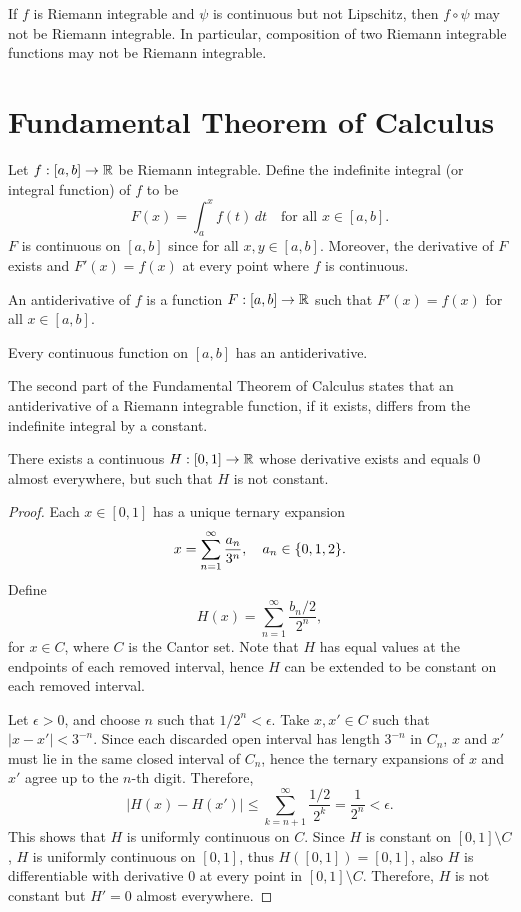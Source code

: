 \begin{rmk}
    If $f$ is Riemann integrable and $\psi$ is continuous but not Lipschitz, then $f \circ \psi$ may not be Riemann integrable. In particular, composition of two Riemann integrable functions may not be Riemann integrable. 
\end{rmk}

\section{Fundamental Theorem of Calculus}

Let $f: [a, b] \to {\mathbb R}$ be Riemann integrable. Define the indefinite integral (or integral function) of $f$ to be
\[
F(x) = \int_a^x f(t) \, dt \quad \text{for all } x \in [a, b].
\]
$F$ is continuous on $[a, b]$ since for all $x, y \in [a, b]$. Moreover, the derivative of $F$ exists and $F'(x) = f(x)$ at every point where $f$ is continuous.

An antiderivative of $f$ is a function $F: [a, b] \to {\mathbb R}$ such that $F'(x) = f(x)$ for all $x \in [a, b]$.

\begin{cl}
    Every continuous function on $[a, b]$ has an antiderivative.
\end{cl}

The second part of the Fundamental Theorem of Calculus states that an antiderivative of a Riemann integrable function, if it exists, differs from the indefinite integral by a constant.

\begin{thm}
    There exists a continuous $H: [0, 1] \to {\mathbb R}$ whose derivative exists and equals $0$ almost everywhere, but such that $H$ is not constant.
    \begin{proof}
        Each $x \in [0, 1]$ has a unique ternary expansion
        \[
        x = \sum_{n=1}^\infty \frac{a_n}{3^n}, \quad a_n \in {\left\{{0, 1, 2}\right\}}.
        \]
        Define
        \[
        H(x) = \sum_{n=1}^\infty \frac{b_n / 2}{2^n}, 
        \]
        for $x \in C$, where $C$ is the Cantor set. Note that $H$ has equal values at the endpoints of each removed interval, hence $H$ can be extended to be constant on each removed interval. 

        Let $\epsilon > 0$, and choose $n$ such that $1/2^n < \epsilon$. Take $x, x' \in C$ such that $|x - x'| < 3^{-n}$. Since each discarded open interval has length $3^{-n}$ in $C_n$, $x$ and $x'$ must lie in the same closed interval of $C_n$, hence the ternary expansions of $x$ and $x'$ agree up to the $n$-th digit. Therefore,
        \[
        |H(x) - H(x')| \leq \sum_{k=n+1}^\infty \frac{1/2}{2^k} = \frac{1}{2^n} < \epsilon.
        \]
        This shows that $H$ is uniformly continuous on $C$. Since $H$ is constant on $[0, 1] \setminus C$, $H$ is uniformly continuous on $[0, 1]$, thus $H([0, 1]) = [0, 1]$, also $H$ is differentiable with derivative $0$ at every point in $[0, 1] \setminus C$. Therefore, $H$ is not constant but $H' = 0$ almost everywhere.
    \end{proof}
\end{thm}

